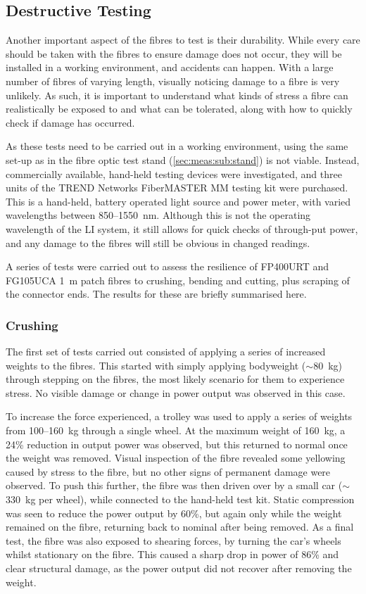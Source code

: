 \documentclass[a4paper,11pt]{article}
\let\oldsim\sim
\renewcommand{\sim}{{\oldsim}}
\begin{document}
\subsection{Destructive Testing}\label{sec:tests:sub:destruction}
Another important aspect of the fibres to test is their durability. While every care should be taken with the fibres to ensure damage does not occur, they will be installed in a working environment, and accidents can happen.  With a large number of fibres of varying length, visually noticing damage to a fibre is very unlikely. As such, it is important to understand what kinds of stress a fibre can realistically be exposed to and what can be tolerated, along with how to quickly check if damage has occurred.

As these tests need to be carried out in a working environment, using the same set-up as in the fibre optic test stand (\cref{sec:meas:sub:stand}) is not viable. Instead, commercially available, hand-held testing devices were investigated, and three units of the TREND Networks FiberMASTER MM testing kit \cite{bib:TREND} were purchased. This is a hand-held, battery operated light source and power meter, with varied wavelengths between 850--1550~nm. Although this is not the operating wavelength of the LI system, it still allows for quick checks of through-put power, and any damage to the fibres will still be obvious in changed readings.

A series of tests were carried out to assess the resilience of FP400URT and FG105UCA 1~m patch fibres to crushing, bending and cutting, plus scraping of the connector ends. The results for these are briefly summarised here.

\subsubsection{Crushing}
The first set of tests carried out consisted of applying a series of increased weights to the fibres. This started with simply applying bodyweight ($\sim80$~kg) through stepping on the fibres, the most likely scenario for them to experience stress. No visible damage or change in power output was observed in this case.

To increase the force experienced, a trolley was used to apply a series of weights from 100--160~kg through a single wheel. At the maximum weight of 160~kg, a 24\% reduction in output power was observed, but this returned to normal once the weight was removed. Visual inspection of the fibre revealed some yellowing caused by stress to the fibre, but no other signs of permanent damage were observed. To push this further, the fibre was then driven over by a small car ($\sim$330~kg per wheel), while connected to the hand-held test kit. Static compression was seen to reduce the power output by 60\%, but again only while the weight remained on the fibre, returning back to nominal after being removed. As a final test, the fibre was also exposed to shearing forces, by turning the car's wheels whilst stationary on the fibre. This caused a sharp drop in power of 86\% and clear structural damage, as the power output did not recover after removing the weight.
\end{document}
